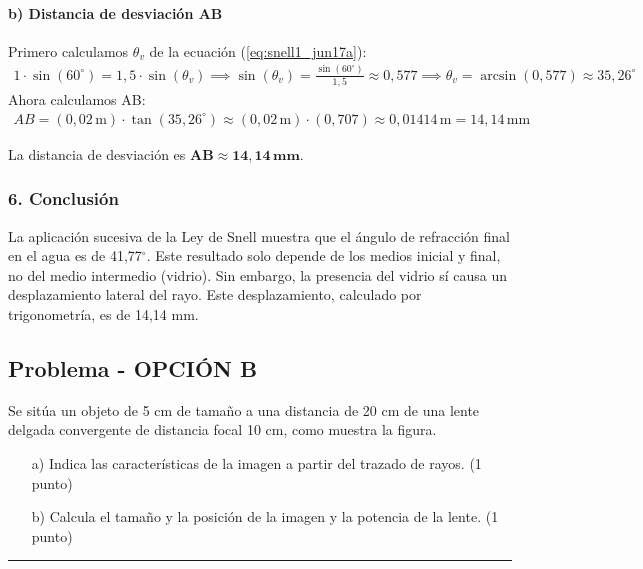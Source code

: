 \paragraph{b) Distancia de desviación AB}
Primero calculamos $\theta_v$ de la ecuación (\ref{eq:snell1_jun17a}):
\begin{gather}
    1 \cdot \sin(60^\circ) = 1,5 \cdot \sin(\theta_v) \implies \sin(\theta_v) = \frac{\sin(60^\circ)}{1,5} \approx 0,577 \implies \theta_v = \arcsin(0,577) \approx 35,26^\circ
\end{gather}
Ahora calculamos AB:
\begin{gather}
    AB = (0,02\,\text{m}) \cdot \tan(35,26^\circ) \approx (0,02\,\text{m}) \cdot (0,707) \approx 0,01414\,\text{m} = 14,14\,\text{mm}
\end{gather}
\begin{cajaresultado}
La distancia de desviación es $\boldsymbol{AB \approx 14,14\,\textbf{mm}}$.
\end{cajaresultado}

\subsubsection*{6. Conclusión}
\begin{cajaconclusion}
La aplicación sucesiva de la Ley de Snell muestra que el ángulo de refracción final en el agua es de 41,77$^{\circ}$. Este resultado solo depende de los medios inicial y final, no del medio intermedio (vidrio). Sin embargo, la presencia del vidrio sí causa un desplazamiento lateral del rayo. Este desplazamiento, calculado por trigonometría, es de 14,14 mm.
\end{cajaconclusion}
\newpage

\subsection{Problema - OPCIÓN B}
\label{subsec:B3B_2017_jun_ord}
\begin{cajaenunciado}
Se sitúa un objeto de 5 cm de tamaño a una distancia de 20 cm de una lente delgada convergente de distancia focal 10 cm, como muestra la figura.
\begin{enumerate}
    \item[a)] Indica las características de la imagen a partir del trazado de rayos. (1 punto)
    \item[b)] Calcula el tamaño y la posición de la imagen y la potencia de la lente. (1 punto)
\end{enumerate}
\end{cajaenunciado}
\hrule

